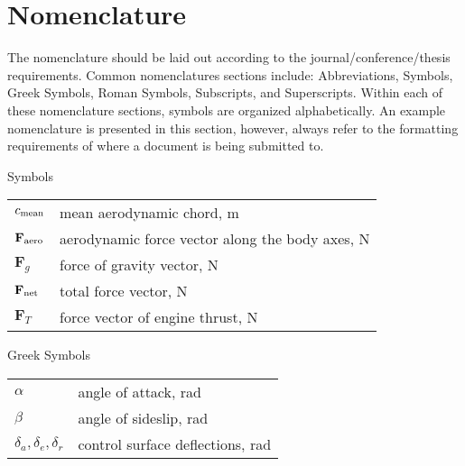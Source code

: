 \section{Nomenclature}

The nomenclature should be laid out according to the journal/conference/thesis requirements. 
Common nomenclatures sections include: Abbreviations, Symbols, Greek Symbols, Roman Symbols, Subscripts, and Superscripts. 
Within each of these nomenclature sections, symbols are organized alphabetically. 
An example nomenclature is presented in this section, however, always refer to the formatting requirements of where a document is being submitted to. \\

{\renewcommand\arraystretch{1.0}
\noindent 
Symbols
	\noindent\begin{longtable*}{@{}l @{\quad=\quad} l@{}}
		$c_{\textup{mean}}$ & mean aerodynamic chord, m \\
		$\textbf{F}_{\textup{aero}}$ & aerodynamic force vector along the body axes, N\\
		$\textbf{F}_{g}$ & force of gravity vector, N \\
		$\textbf{F}_{\textup{net}}$ & total force vector, N\\
		$\textbf{F}_{T}$ & force vector of engine thrust, N
\end{longtable*}
\noindent
Greek Symbols
\noindent\begin{longtable*}{@{}l @{\quad=\quad} l@{}}
	$\alpha$ & angle of attack, rad \\
	$\beta$ & angle of sideslip, rad \\
	$\delta_{a}, \delta_{e}, \delta_{r}$ & control surface deflections, rad
\end{longtable*}}
